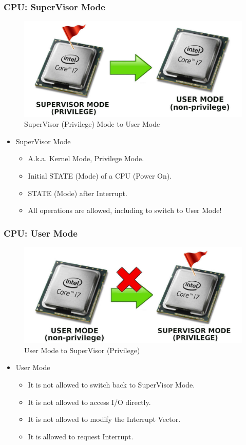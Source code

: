\documentclass[xcolor=table, notheorems, hyperref={pdfpagelabels=false}]{beamer}
\begin{document}
\begin{frame}
\frametitle{CPU: SuperVisor Mode}
\begin{figure}
\includegraphics[width=0.65\linewidth]{os-super2user}
\caption{SuperVisor (Privilege) Mode to User Mode}
\end{figure}
\begin{itemize}
\item SuperVisor Mode
\begin{itemize}
\item A.k.a. Kernel Mode, Privilege Mode.
\item Initial STATE (Mode) of a CPU (Power On).
\item STATE (Mode) after Interrupt.
\item All operations are allowed, including to switch to User Mode!
\end{itemize}
\end{itemize}
\end{frame}

\begin{frame}
\frametitle{CPU: User Mode}
\begin{figure}
\includegraphics[width=0.65\linewidth]{os-user2super}
\caption{User Mode to SuperVisor (Privilege)}
\end{figure}
\begin{itemize}
\item User Mode
\begin{itemize}
\item It is not allowed to switch back to SuperVisor Mode.
\item It is not allowed to access I/O directly.
\item It is not allowed to modify the Interrupt Vector.
\item It is allowed to request Interrupt.
\end{itemize}
\end{itemize}
\end{frame}
\end{document}
